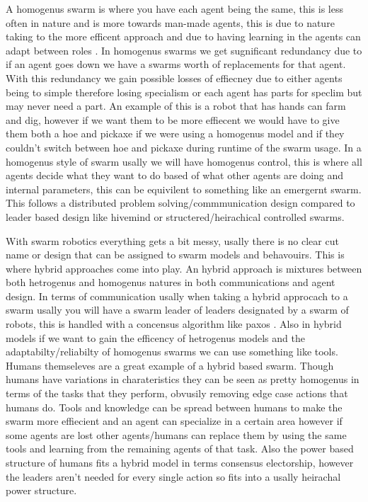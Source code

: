 \documentclass{UoYCSproject}
\begin{document}
A homogenus swarm is where you have each agent being the same, this is less often in nature and is more towards man-made agents, this is due to nature taking to the more efficent approach and due to having learning in the agents can adapt between roles \cite{Swarm robotics reviewed, Swarm intellegiegence}.
In homogenus swarms we get sugnificant redundancy due to if an agent goes down we have a swarms worth of replacements for that agent.
With this redundancy we gain possible losses of effiecney due to either agents being to simple therefore losing specialism or each agent has parts for speclim but may never need a part.
An example of this is a robot that has hands can farm and dig, however if we want them to be more effiecent we would have to give them both a hoe and pickaxe if we were using a homogenus model and if they couldn't switch between hoe and pickaxe during runtime of the swarm usage.
In a homogenus style of swarm usally we will have homogenus control, this is where all agents decide what they want to do based of what other agents are doing and internal parameters, this can be equivilent to something like an emergernt swarm.
This follows a distributed problem solving/commmunication design compared to  leader based design like hivemind or structered/heirachical controlled swarms.

With swarm robotics everything gets a bit messy, usally there is no clear cut name or design that can be assigned to swarm models and behavouirs.
This is where hybrid approaches come into play.
An hybrid approach is mixtures between both hetrogenus and homogenus natures in both communications and agent design. 
In terms of communication usally when taking a hybrid approcach to a swarm usally you will have a swarm leader of leaders designated by a swarm of robots, this is handled with a concensus algorithm like paxos \cite{paxos}.
Also in hybrid models if we want to gain the efficency of hetrogenus models and the adaptabilty/reliabilty of homogenus swarms we can use something like tools.
Humans themseleves are a great example of a hybrid based swarm.
Though humans have variations in charateristics they can be seen as pretty homogenus in terms of the tasks that they perform, obvusily removing edge case actions that humans do.
Tools and knowledge can be spread between humans to make the swarm more effiecient and an agent can specialize in a certain area however if some agents are lost other agents/humans can replace them by using the same tools and learning from the remaining agents of that task.
Also the power based structure of humans fits a hybrid model in terms consensus electorship, however the leaders aren't needed for every single action so fits into a usally heirachal power structure.
\end{document}
